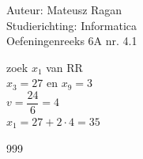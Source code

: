 \documentclass[a4paper]{article}
\begin{document}
\noindent \large Auteur: Mateusz Ragan \\
\noindent \large Studierichting: Informatica\\
\noindent \large Oefeningenreeks 6A nr. 4.1\\

\medskip

\normalsize

zoek $x_{1}$ van RR\\

$x_3 = 27 $ en $ x_9 = 3$\\

$v = \dfrac{24}{6} = 4$\\

$x_1 = 27+2 \cdot 4 = 35$

\begin{thebibliography}{999}
\end{thebibliography}
\end{document}
